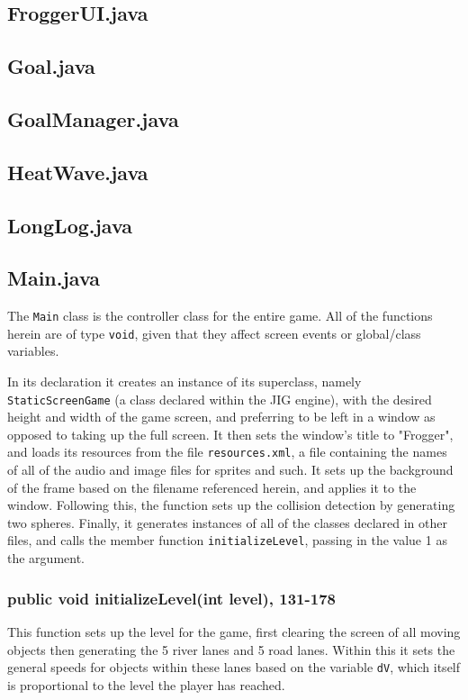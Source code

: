 \documentclass[12pt]{article}
\begin{document}
\subsection{FroggerUI.java}

\subsection{Goal.java}

\subsection{GoalManager.java}

\subsection{HeatWave.java}

\subsection{LongLog.java}

\subsection{Main.java}
The \verb|Main| class is the controller class for the entire game.
All of the functions herein are of type \verb|void|, given that they affect screen events or global/class variables.

In its declaration it creates an instance of its superclass, namely \verb|StaticScreenGame| (a class declared within the JIG engine), with the desired height and width of the game screen, and preferring to be left in a window as opposed to taking up the full screen.
It then sets the window's title to "Frogger", and loads its resources from the file \verb|resources.xml|, a file containing the names of all of the audio and image files for sprites and such.
It sets up the background of the frame based on the filename referenced herein, and applies it to the window.
Following this, the function sets up the collision detection by generating two spheres.
Finally, it generates instances of all of the classes declared in other files, and calls the member function \verb|initializeLevel|, passing in the value 1 as the argument.

\subsubsection{public void initializeLevel(int level), 131-178}
This function sets up the level for the game, first clearing the screen of all moving objects then generating the 5 river lanes and 5 road lanes.
Within this it sets the general speeds for objects within these lanes based on the variable \verb|dV|, which itself is proportional to the level the player has reached.
\end{document}
